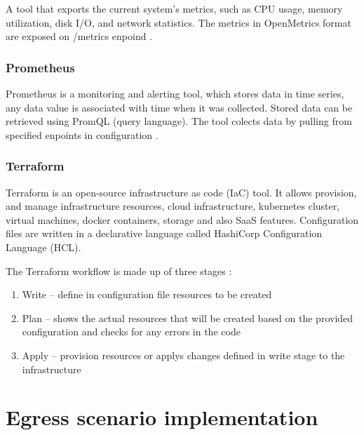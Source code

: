 A tool that exports the current system's metrics, such as CPU usage, memory utilization, disk I/O, and network statistics. The metrics in OpenMetrics format are exposed on /metrics enpoind \cite{NodeExporter}.

\subsubsection{Prometheus}
\label{sec:prometheus}

Prometheus is a monitoring and alerting tool, which stores data in time series, any data value is associated with time when it was collected. Stored data can be retrieved using PromQL (query language). The tool colects data by pulling from specified enpoints in configuration \cite{Prometheus}. 

\subsubsection{Terraform}
\label{sec:terraform}

Terraform is an open-source infrastructure as code (IaC) tool. It allows provision, and manage infrastructure resources, cloud infrastructure, kubernetes cluster, virtual machines, docker containers, storage and also SaaS features. Configuration files are written in a declarative language called HashiCorp Configuration Language (HCL).

The Terraform workflow is made up of three stages \cite{Terraform}:
\begin{enumerate}
  \item Write -- define in configuration file resources to be created
  \item Plan -- shows the actual resources that will be created based on the provided configuration and checks for any errors in the code
  \item Apply -- provision resources or applys changes defined in write stage to the infrastructure 
\end{enumerate}





\section{Egress scenario implementation}
\label{sec:egressImpl}


